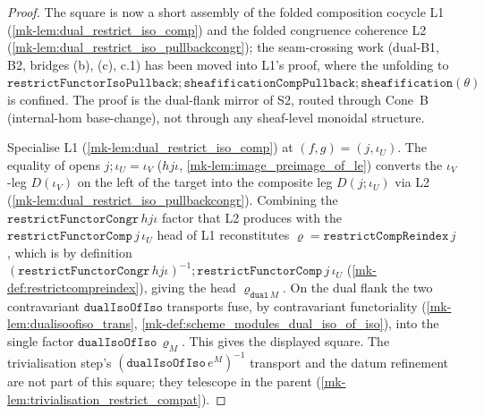 \begin{proof}
  \leanok
  The square is now a short assembly of the folded composition cocycle L1
  (\ref{mk-lem:dual_restrict_iso_comp}) and the folded congruence coherence L2
  (\ref{mk-lem:dual_restrict_iso_pullbackcongr}); the seam-crossing work (dual-B1, B2, bridges (b), (c),
  c.1) has been moved into L1's proof, where the unfolding to
  \(\mathtt{restrictFunctorIsoPullback} \mathbin{;} \mathtt{sheafificationCompPullback}
  \mathbin{;} \mathtt{sheafification}(\theta)\) is confined. The proof is the dual-flank mirror of S2,
  routed through Cone~B (internal-hom base-change), not through any sheaf-level monoidal structure.

  Specialise L1 (\ref{mk-lem:dual_restrict_iso_comp}) at \((f, g) = (j, \iota_U)\). The equality of opens
  \(j \mathbin{;} \iota_U = \iota_V\) (\(hjι\), \ref{mk-lem:image_preimage_of_le}) converts the
  \(\iota_V\)-leg \(D(\iota_V)\) on the left of the target into the composite leg \(D(j\mathbin{;}\iota_U)\)
  via L2 (\ref{mk-lem:dual_restrict_iso_pullbackcongr}). Combining the \(\mathtt{restrictFunctorCongr}\,hjι\)
  factor that L2 produces with the \(\mathtt{restrictFunctorComp}\,j\,\iota_U\) head of L1 reconstitutes
  \(\varrho = \mathtt{restrictCompReindex}\,j\), which is by definition
  \((\mathtt{restrictFunctorCongr}\,hjι)^{-1} \mathbin{;} \mathtt{restrictFunctorComp}\,j\,\iota_U\)
  (\ref{mk-def:restrictcompreindex}), giving the head \(\varrho_{\mathtt{dual}\,M}\). On the dual flank the
  two contravariant \(\mathtt{dualIsoOfIso}\) transports fuse, by contravariant functoriality
  (\ref{mk-lem:dualisoofiso_trans}, \ref{mk-def:scheme_modules_dual_iso_of_iso}), into the single factor
  \(\mathtt{dualIsoOfIso}\,\varrho_M\). This gives the displayed square. The trivialisation
  step's \((\mathtt{dualIsoOfIso}\,e^M)^{-1}\) transport and the datum refinement are not part of this
  square; they telescope in the parent (\ref{mk-lem:trivialisation_restrict_compat}).
\end{proof}

